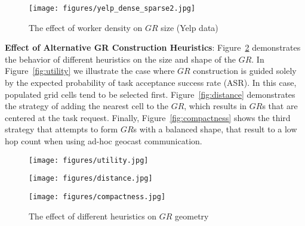 \documentclass{USC-Thesis}
\newcommand{\PGC}{{\em PrivGeoCrowd}}
\numberwithin{equation}{chapter}
\begin{document}

\begin{figure}[!htb]
\centering
  \texttt{[image: figures/yelp\_dense\_sparse2.jpg]}
  \caption{The effect of worker density on $\mathit{GR}$ size (Yelp data)}
  \label{fig:dense_sparse}
\end{figure}

\textbf{Effect of Alternative GR Construction Heuristics}: Figure~\ref{fig:heuristics} demonstrates the behavior of different heuristics on the size and shape of the $\mathit{GR}$. In Figure~\ref{fig:utility} we illustrate the case where $GR$ construction is guided solely by the expected probability of task acceptance success rate (ASR). In this case, populated grid cells tend to be selected first. Figure~\ref{fig:distance} demonstrates the strategy of adding the nearest cell to the $GR$, which results in $\mathit{GR}$s that are centered at the task request. Finally, Figure~\ref{fig:compactness} shows the third strategy that attempts to form $GR$s with a balanced shape, that result to a low hop count when using ad-hoc geocast communication.

\begin{figure}[!ht]
	\centering
	\begin{minipage}[b]{0.25\linewidth}
		\texttt{[image: figures/utility.jpg]}
		\label{fig:utility}
	\end{minipage}
	\hspace{0.5cm}
	\centering
	\begin{minipage}[b]{0.25\linewidth}
		\texttt{[image: figures/distance.jpg]}
		\label{fig:distance}
	\end{minipage}
	\hspace{0.5cm}
	\centering
	\begin{minipage}[b]{0.26\linewidth}
		\texttt{[image: figures/compactness.jpg]}
		\label{fig:compactness}
	\end{minipage}
	\caption{The effect of different heuristics on $\mathit{GR}$ geometry}	
\label{fig:heuristics}
\end{figure}
\end{document}
